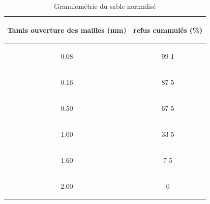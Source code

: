 \documentclass[12pt]{report}
\begin{document}
\begin{table}[h]
\begin{center}
\begin{tabular}{cc}
\hline
\begin{bf}Tamis ouverture des mailles (mm)\end{bf}   &   \begin{bf}refus cummulés (\%)\end{bf} \\
\hline 
\begin{bf}\rowcolor{cyan}0.08\end{bf}   &   \begin{bf}99 \pm{}1 \end{bf} \\ 
\begin{bf}0.16\end{bf}   &   \begin{bf}87 \pm{}5\end{bf} \\
\begin{bf}\rowcolor{cyan}0.50\end{bf}   &   \begin{bf}67 \pm{}5\end{bf} \\
\begin{bf}1.00\end{bf}   &   \begin{bf}33 \pm{}5\end{bf} \\
\begin{bf}\rowcolor{cyan}1.60\end{bf}   &   \begin{bf}7 \pm{}5\end{bf} \\
\begin{bf}2.00\end{bf}   &   \begin{bf}0\end{bf} \\
\hline 
\end{tabular}
\end{center}
\caption{Granulométrie du sable normalisé}
\label{sable}
\end{table}
\end{document}
